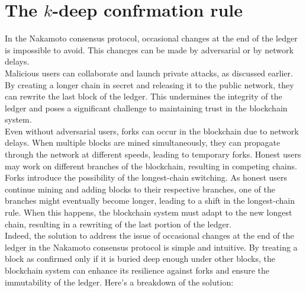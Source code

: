 \section{The $k$-deep confrmation rule}
In the Nakamoto consensus protocol, occasional changes at the end of the ledger is impossible to avoid. This chancges can be made by adversarial or by network delays.\\
Malicious users can collaborate and launch private attacks, as discussed earlier. By creating a longer chain in secret and releasing it to the public network, they can rewrite the last block of the ledger. This undermines the integrity of the ledger and poses a significant challenge to maintaining trust in the blockchain system.\\
Even without adversarial users, forks can occur in the blockchain due to network delays. When multiple blocks are mined simultaneously, they can propagate through the network at different speeds, leading to temporary forks. Honest users may work on different branches of the blockchain, resulting in competing chains.\\
Forks introduce the possibility of the longest-chain switching. As honest users continue mining and adding blocks to their respective branches, one of the branches might eventually become longer, leading to a shift in the longest-chain rule. When this happens, the blockchain system must adapt to the new longest chain, resulting in a rewriting of the last portion of the ledger.\\
Indeed, the solution to address the issue of occasional changes at the end of the ledger in the Nakamoto consensus protocol is simple and intuitive. By treating a block as confirmed only if it is buried deep enough under other blocks, the blockchain system can enhance its resilience against forks and ensure the immutability of the ledger. Here's a breakdown of the solution:
